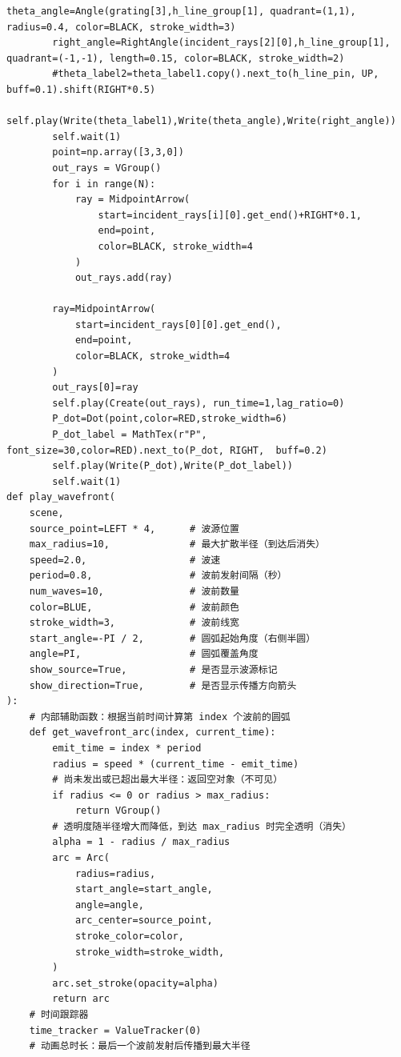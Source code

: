 \documentclass[12pt,a4paper]{ctexrep}
\begin{document}
\begin{lstlisting}[style=pycode]
        theta_angle=Angle(grating[3],h_line_group[1], quadrant=(1,1), radius=0.4, color=BLACK, stroke_width=3)
        right_angle=RightAngle(incident_rays[2][0],h_line_group[1], quadrant=(-1,-1), length=0.15, color=BLACK, stroke_width=2)
        #theta_label2=theta_label1.copy().next_to(h_line_pin, UP, buff=0.1).shift(RIGHT*0.5)
        self.play(Write(theta_label1),Write(theta_angle),Write(right_angle))
        self.wait(1)
        point=np.array([3,3,0])
        out_rays = VGroup()
        for i in range(N):
            ray = MidpointArrow(
                start=incident_rays[i][0].get_end()+RIGHT*0.1,
                end=point,
                color=BLACK, stroke_width=4
            )
            out_rays.add(ray)

        ray=MidpointArrow(
            start=incident_rays[0][0].get_end(),
            end=point,
            color=BLACK, stroke_width=4
        )
        out_rays[0]=ray
        self.play(Create(out_rays), run_time=1,lag_ratio=0)
        P_dot=Dot(point,color=RED,stroke_width=6)
        P_dot_label = MathTex(r"P", font_size=30,color=RED).next_to(P_dot, RIGHT,  buff=0.2)
        self.play(Write(P_dot),Write(P_dot_label))
        self.wait(1)
def play_wavefront(
    scene,
    source_point=LEFT * 4,      # 波源位置
    max_radius=10,              # 最大扩散半径（到达后消失）
    speed=2.0,                  # 波速
    period=0.8,                 # 波前发射间隔（秒）
    num_waves=10,               # 波前数量
    color=BLUE,                 # 波前颜色
    stroke_width=3,             # 波前线宽
    start_angle=-PI / 2,        # 圆弧起始角度（右侧半圆）
    angle=PI,                   # 圆弧覆盖角度
    show_source=True,           # 是否显示波源标记
    show_direction=True,        # 是否显示传播方向箭头
):
    # 内部辅助函数：根据当前时间计算第 index 个波前的圆弧
    def get_wavefront_arc(index, current_time):
        emit_time = index * period
        radius = speed * (current_time - emit_time)
        # 尚未发出或已超出最大半径：返回空对象（不可见）
        if radius <= 0 or radius > max_radius:
            return VGroup()
        # 透明度随半径增大而降低，到达 max_radius 时完全透明（消失）
        alpha = 1 - radius / max_radius
        arc = Arc(
            radius=radius,
            start_angle=start_angle,
            angle=angle,
            arc_center=source_point,
            stroke_color=color,
            stroke_width=stroke_width,
        )
        arc.set_stroke(opacity=alpha)
        return arc
    # 时间跟踪器
    time_tracker = ValueTracker(0)
    # 动画总时长：最后一个波前发射后传播到最大半径

\end{lstlisting}
\end{document}

